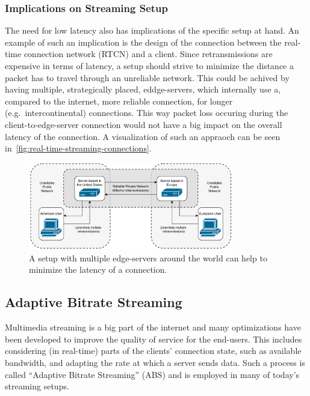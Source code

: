\subsubsection{Implications on Streaming Setup}
The need for low latency also has implications of the specific setup at hand.
An example of such an implication is the design of the connection between the 
real-time connection network (RTCN) and a client.
Since retransmissions are expensive in terms of latency, a setup should strive to minimize 
the distance a packet has to travel through an unreliable network.
This could be achived by having multiple, strategically placed, eddge-servers, which internally use 
a, compared to the internet, more reliable connection, for longer (e.g.~intercontinental) connections.
This way packet loss occuring during the client-to-edge-server connection would not have a big 
impact on the overall latency of the connection.
A visualization of such an appraoch can be seen in~\autoref{fig:real-time-streaming-connections}.

\vspace{0.5cm}
\begin{figure}[H]
    \centering
    \includegraphics[width=0.8\textwidth]{figures/02_background/real-time-streaming-connections.drawio.pdf}
    \caption[Real-time streaming connections]{A setup with multiple edge-servers around the world
    can help to minimize the latency of a connection.}\label{fig:real-time-streaming-connections}
\end{figure}

\subsection{Adaptive Bitrate Streaming}\label{subsec:adaptive_bitrate_streaming}
Multimedia streaming is a big part of the internet and many optimizations have
been developed to improve the quality of service for the end-users.
This includes considering (in real-time) parts of the clients' connection state, 
such as available bandwidth, and adapting the rate at which a server sends data.
Such a process is called ``Adaptive Bitrate Streaming'' (ABS) and is employed in many 
of today's streaming setups.

